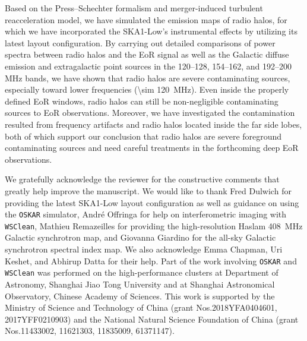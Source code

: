 \documentclass[twocolumn]{aastex62}
\begin{document}
Based on the Press--Schechter formalism and merger-induced turbulent
reacceleration model, we have simulated the emission maps of radio halos,
for which we have incorporated the SKA1-Low's instrumental effects by
utilizing its latest layout configuration.
By carrying out detailed comparisons of power spectra between radio halos
and the EoR signal as well as the Galactic diffuse emission and
extragalactic point sources in the \numrange{120}{128},
\numrange{154}{162}, and \numrange{192}{200} \si{\MHz} bands,
we have shown that radio halos are severe contaminating sources,
especially toward lower frequencies (\SI{\sim 120}{\MHz}).
Even inside the properly defined EoR windows, radio halos can still
be non-negligible contaminating sources to EoR observations.
Moreover, we have investigated the contamination resulted from
frequency artifacts and radio halos located inside the far side lobes,
both of which support our conclusion that radio halos are severe
foreground contaminating sources and need careful treatments in the
forthcoming deep EoR observations.


\acknowledgments

We gratefully acknowledge the reviewer for the constructive
comments that greatly help improve the manuscript.
We would like to thank
Fred Dulwich for providing the latest SKA1-Low layout configuration
as well as guidance on using the \texttt{OSKAR} simulator,
Andr\'e Offringa for help on interferometric imaging with
\texttt{WSClean},
Mathieu Remazeilles for providing the high-resolution Haslam
\SI{408}{\MHz} Galactic synchrotron map,
and Giovanna Giardino for the all-sky Galactic synchrotron spectral
index map.
We also acknowledge Emma Chapman, Uri Keshet, and Abhirup Datta for
their help.
Part of the work involving \texttt{OSKAR} and \texttt{WSClean} was
performed on the high-performance clusters
at Department of Astronomy, Shanghai Jiao Tong University and
at Shanghai Astronomical Observatory, Chinese Academy of Sciences.
This work is supported by
the Ministry of Science and Technology of China
(grant Nos.\@ 2018YFA0404601, 2017YFF0210903)
and the National Natural Science Foundation of China
(grant Nos.\@ 11433002, 11621303, 11835009, 61371147).


%
\end{document}
